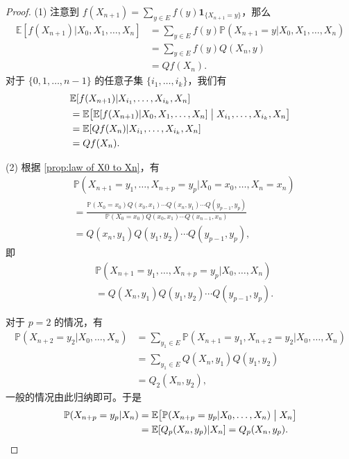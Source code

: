 \documentclass[fontset=none]{Notes}
\newcommand{\indicator}[1]{\mathbold 1_{#1}}
\begin{document}
\begin{proof}
  (1) 注意到 $f(X_{n+1})=\sum_{y\in E}f(y)\indicator{\{X_{n+1}=y\}}$，那么
  \begin{align*}
    \mathbb{E}[f(X_{n+1})|X_0,X_1,\dots,X_n]
    &=\sum_{y\in E}f(y)\mathbb{P}(X_{n+1}=y|X_0,X_1,\dots,X_n)\\
    &=\sum_{y\in E}f(y)Q(X_n,y)\\
    &=Qf(X_n).
  \end{align*}
  对于 $\{0,1,\dots,n-1\}$ 的任意子集 $\{i_1,\dots,i_k\}$，我们有
  \begin{align*}
    &\mathbb{E}[f(X_{n+1})|X_{i_1},\dots,X_{i_k},X_n]\\
    &=\mathbb{E}\bigl[\mathbb{E}[f(X_{n+1})|X_0,X_1,\dots,X_n]\bigm| X_{i_1},\dots,X_{i_k},X_n\bigr]\\
    &=\mathbb{E}[Qf(X_n)|X_{i_1},\dots,X_{i_k},X_n]\\
    &=Qf(X_n).
  \end{align*}

  (2) 根据 \autoref{prop:law of X0 to Xn}，有
  \begin{align*}
    &\mathbb{P}(X_{n+1}=y_1,\dots,X_{n+p}=y_p|X_0=x_0,\dots,X_n=x_n)\\
    &=\frac{\mathbb{P}(X_0=x_0)Q(x_0,x_1)\cdots Q(x_n,y_1)\cdots Q(y_{p-1},y_p)}{
      \mathbb{P}(X_0=x_0)Q(x_0,x_1)\cdots Q(x_{n-1},x_n)
    }\\
    &=Q(x_n,y_1)Q(y_1,y_2)\cdots Q(y_{p-1},y_p),
  \end{align*}
  即 
  \begin{align*}
    &\mathbb{P}(X_{n+1}=y_1,\dots,X_{n+p}=y_p|X_0,\dots,X_n)\\
    &=Q(X_n,y_1)Q(y_1,y_2)\cdots Q(y_{p-1},y_p).
  \end{align*}

  对于 $p=2$ 的情况，有
  \begin{align*}
    \mathbb{P}(X_{n+2}=y_2|X_0,\dots,X_n)
    &=\sum_{y_1\in E}\mathbb{P}(X_{n+1}=y_1,X_{n+2}=y_2|X_0,\dots,X_n)\\
    &=\sum_{y_1\in E} Q(X_n,y_1)Q(y_1,y_2)\\
    &=Q_2(X_n,y_2),
  \end{align*}
  一般的情况由此归纳即可。于是
  \begin{align*}
    \mathbb{P}(X_{n+p}=y_p|X_n)
    &=\mathbb{E}\bigl[\mathbb{P}(X_{n+p}=y_p|X_0,\dots,X_n)\bigm| X_n\bigr]\\
    &=\mathbb{E}[Q_p(X_n,y_p)|X_n]=Q_p(X_n,y_p).
  \end{align*}


\end{proof}
\end{document}
